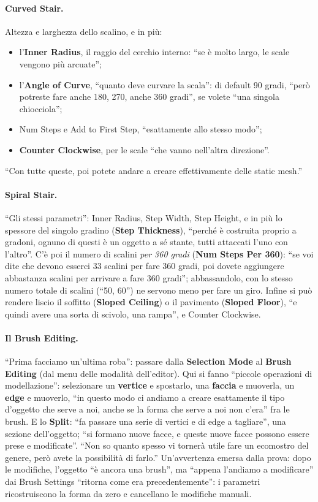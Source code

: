 \paragraph{Curved Stair.} Altezza e larghezza dello scalino, e in più:
\begin{itemize}
  \item l'\textbf{Inner Radius}, il raggio del cerchio interno: ``se è molto largo, le
        scale vengono più arcuate'';
  \item l'\textbf{Angle of Curve}, ``quanto deve curvare la scala'': di default 90 gradi,
        ``però potreste fare anche 180, 270, anche 360 gradi'', se volete ``una singola
        chiocciola'';
  \item Num Steps e Add to First Step, ``esattamente allo stesso modo'';
  \item \textbf{Counter Clockwise}, per le scale ``che vanno nell'altra direzione''.
\end{itemize}
``Con tutte queste, poi potete andare a creare effettivamente delle static mesh.''

\paragraph{Spiral Stair.} ``Gli stessi parametri'': Inner Radius, Step Width, Step Height,
e in più lo spessore del singolo gradino (\textbf{Step Thickness}), ``perché è costruita
proprio a gradoni, ognuno di questi è un oggetto a sé stante, tutti attaccati l'uno con
l'altro''. C'è poi il numero di scalini \emph{per 360 gradi} (\textbf{Num Steps Per 360}):
``se voi dite che devono esserci 33 scalini per fare 360 gradi, poi dovete aggiungere
abbastanza scalini per arrivare a fare 360 gradi''; abbassandolo, con lo stesso numero
totale di scalini (``50, 60'') ne servono meno per fare un giro. Infine si può rendere
liscio il soffitto (\textbf{Sloped Ceiling}) o il pavimento (\textbf{Sloped Floor}), ``e
quindi avere una sorta di scivolo, una rampa'', e Counter Clockwise.

\paragraph{Il Brush Editing.} ``Prima facciamo un'ultima roba'': passare dalla
\textbf{Selection Mode} al \textbf{Brush Editing} (dal menu delle modalità dell'editor). Qui
si fanno ``piccole operazioni di modellazione'': selezionare un \textbf{vertice} e
spostarlo, una \textbf{faccia} e muoverla, un \textbf{edge} e muoverlo, ``in questo modo ci
andiamo a creare esattamente il tipo d'oggetto che serve a noi, anche se la forma che
serve a noi non c'era'' fra le brush. E lo \textbf{Split}: ``fa passare una serie di
vertici e di edge a tagliare'', una sezione dell'oggetto; ``si formano nuove facce, e
queste nuove facce possono essere prese e modificate''. ``Non so quanto spesso vi tornerà
utile fare un ecomostro del genere, però avete la possibilità di farlo.'' Un'avvertenza
emersa dalla prova: dopo le modifiche, l'oggetto ``è ancora una brush'', ma ``appena
l'andiamo a modificare'' dai Brush Settings ``ritorna come era precedentemente'': i
parametri ricostruiscono la forma da zero e cancellano le modifiche manuali.

